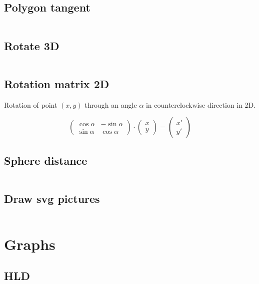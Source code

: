 \documentclass{article}
\begin{document}
\subsection{Polygon tangent}
\inputminted[mathescape, breaklines, breakafter=(, tabsize=2, frame=lines, showtabs, tab=|\ , tabcolor=lightgray]{c++}{./geometry/polygon-tangent/polygon-tangent.cpp}
\subsection{Rotate 3D}
\inputminted[mathescape, breaklines, breakafter=(, tabsize=2, frame=lines, showtabs, tab=|\ , tabcolor=lightgray]{c++}{./geometry/rotate-3d/rotate-3d.cpp}
\subsection{Rotation matrix 2D}
Rotation of point $(x, y)$ through an angle $\alpha$ in counterclockwise direction in 2D.

$$
\begin{pmatrix}
\cos \alpha & -\sin \alpha \\
\sin \alpha & \cos \alpha
\end{pmatrix}
\cdot
\begin{pmatrix}
x \\
y
\end{pmatrix}
=
\begin{pmatrix}
x' \\
y'
\end{pmatrix}
$$
\subsection{Sphere distance}
\inputminted[mathescape, breaklines, breakafter=(, tabsize=2, frame=lines, showtabs, tab=|\ , tabcolor=lightgray]{c++}{./geometry/sphere-dist/sphere-dist.cpp}
\subsection{Draw svg pictures}
\inputminted[mathescape, breaklines, breakafter=(, tabsize=2, frame=lines, showtabs, tab=|\ , tabcolor=lightgray]{c++}{./geometry/svg-draw/svg-draw.cpp}
\section{Graphs}
\subsection{HLD}
\inputminted[mathescape, breaklines, breakafter=(, tabsize=2, frame=lines, showtabs, tab=|\ , tabcolor=lightgray]{c++}{./graphs/HLD/hld.cpp}
\end{document}
